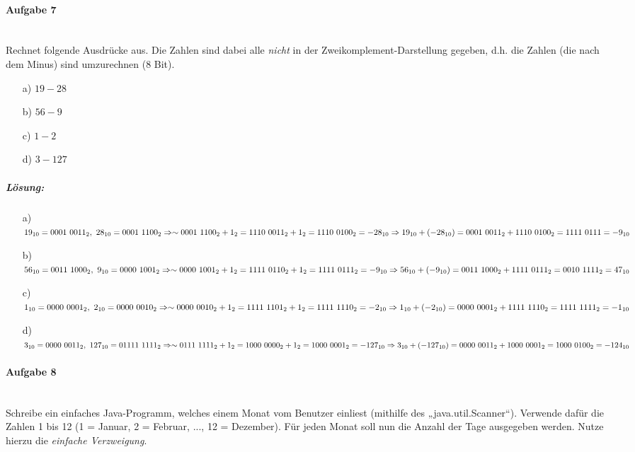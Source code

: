 \documentclass[12pt,a4paper,ngerman]{scrartcl}
\begin{document}
	\paragraph{Aufgabe 7}\mbox{}\\
	Rechnet folgende Ausdrücke aus. Die Zahlen sind dabei alle \emph{nicht} in der Zweikomplement-Darstellung gegeben, d.h. die Zahlen (die nach dem Minus) sind umzurechnen (8 Bit).
	\begin{itemize}
		\item[a)] $19 - 28$
		\item[b)] $56 - 9$
		\item[c)] $1 - 2$
		\item[d)] $3 - 127$
	\end{itemize}
	
	\subparagraph{Lösung:} 
	\begin{itemize}
		\item[a)] $19_{10} = 0001\ 0011_2,\ 28_{10} = 0001\ 1100_2\\
			\Rightarrow \sim 0001\ 1100_2 + 1_2 = 1110\ 0011_2 + 1_2 = 1110\ 0100_2 = -28_{10}\\
			\Rightarrow 19_{10} + (-28_{10}) = 0001\ 0011_2 + 1110\ 0100_2 = 1111\ 0111 = -9_{10}$
		\item[b)] $56_{10} = 0011\ 1000_2,\ 9_{10} = 0000\ 1001_2\\
			\Rightarrow \sim 0000\ 1001_2 + 1_2 = 1111\ 0110_2 + 1_2 = 1111\ 0111_2 = -9_{10}\\
			\Rightarrow 56_{10} + (-9_{10}) = 0011\ 1000_2 + 1111\ 0111_2 = 0010\ 1111_2 = 47_{10}$
		\item[c)] $1_{10} = 0000\ 0001_2,\ 2_{10} = 0000\ 0010_2\\
			\Rightarrow \sim 0000\ 0010_2 + 1_2 = 1111\ 1101_2 + 1_2 = 1111\ 1110_2 = -2_{10}\\
			\Rightarrow 1_{10} + (-2_{10}) = 0000\ 0001_2 + 1111\ 1110_2 = 1111\ 1111_2 = -1_{10}$
		\item[d)] $3_{10} = 0000\ 0011_2,\ 127_{10} = 01111\ 1111_2\\
			\Rightarrow \sim 0111\ 1111_2 + 1_2 = 1000\ 0000_2 + 1_2 = 1000\ 0001_2 = -127_{10}\\
			\Rightarrow 3_{10} + (-127_{10}) = 0000\ 0011_2 + 1000\ 0001_2 = 1000\ 0100_2 = -124_{10}$
	\end{itemize}

	\newpage
	
	\paragraph{Aufgabe 8}\mbox{}\\
	Schreibe ein einfaches Java-Programm, welches einem Monat vom Benutzer einliest (mithilfe des „java.util.Scanner“).
	Verwende dafür die Zahlen 1 bis 12 (1 = Januar, 2 = Februar, ..., 12 = Dezember). Für jeden Monat soll nun die Anzahl der Tage ausgegeben werden.
	Nutze hierzu die \emph{einfache Verzweigung}.
	
\end{document}

